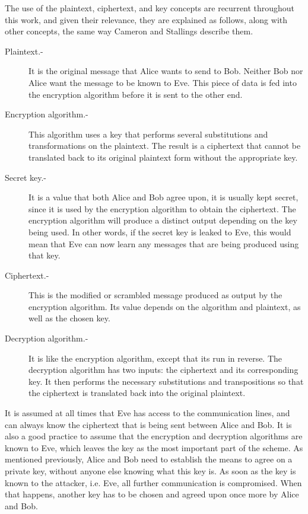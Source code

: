The use of the plaintext, ciphertext, and key concepts are recurrent throughout this work, and given their relevance, they are explained as follows, along with other concepts, the same way Cameron \cite{CryptoNotes} and Stallings \cite{CryptoStallings} describe them.
\begin{description}
\item[Plaintext.-] It is the original message that Alice wants to send to Bob. Neither Bob nor Alice want the message to be known to Eve. This piece of data is fed into the encryption algorithm before it is sent to the other end.
\item[Encryption algorithm.-] This algorithm uses a key that performs several substitutions and transformations on the plaintext. The result is a ciphertext that cannot be translated back to its original plaintext form without the appropriate key.
\item[Secret key.-] It is a value that both Alice and Bob agree upon, it is usually kept secret, since it is used by the encryption algorithm to obtain the ciphertext. The encryption algorithm will produce a distinct output depending on the key being used. In other words, if the secret key is leaked to Eve, this would mean that Eve can now learn any messages that are being produced using that key.
\item[Ciphertext.-] This is the modified or scrambled message produced as output by the encryption algorithm. Its value depends on the algorithm and plaintext, as well as the chosen key.
\item[Decryption algorithm.-] It is like the encryption algorithm, except that its run in reverse. The decryption algorithm has two inputs: the ciphertext and its corresponding key. It then performs the necessary substitutions and transpositions so that the ciphertext is translated back into the original plaintext.
\end{description}

It is assumed at all times that Eve has access to the communication lines, and can always know the ciphertext that is being sent between Alice and Bob. It is also a good practice to assume that the encryption and decryption algorithms are known to Eve, which leaves the key as the most important part of the scheme. As mentioned previously, Alice and Bob need to establish the means to agree on a private key, without anyone else knowing what this key is. As soon as the key is known to the attacker, i.e. Eve, all further communication is compromised. When that happens, another key has to be chosen and agreed upon once more by Alice and Bob.

